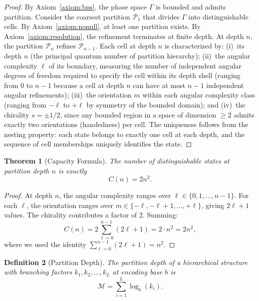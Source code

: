 \documentclass[twocolumn,10pt]{article}
\newtheorem{theorem}{Theorem}[section]
\newtheorem{definition}[theorem]{Definition}
\theoremstyle{remark}
\newcommand{\Depth}{\mathcal{M}}
\newcommand{\Partition}{\mathcal{P}}
\begin{document}
\begin{proof}
By Axiom~\ref{axiom:bps}, the phase space $\Gamma$ is bounded and admits partition. Consider the coarsest partition $\Partition_1$ that divides $\Gamma$ into distinguishable cells. By Axiom~\ref{axiom:nonull}, at least one partition exists. By Axiom~\ref{axiom:resolution}, the refinement terminates at finite depth. At depth $n$, the partition $\Partition_n$ refines $\Partition_{n-1}$. Each cell at depth $n$ is characterized by: (i)~its depth $n$ (the principal quantum number of partition hierarchy); (ii)~the angular complexity $\ell$ of its boundary, measuring the number of independent angular degrees of freedom required to specify the cell within its depth shell (ranging from $0$ to $n-1$ because a cell at depth $n$ can have at most $n-1$ independent angular refinements); (iii)~the orientation $m$ within each angular complexity class (ranging from $-\ell$ to $+\ell$ by symmetry of the bounded domain); and (iv)~the chirality $s = \pm 1/2$, since any bounded region in a space of dimension $\geq 2$ admits exactly two orientations (handedness) per cell. The uniqueness follows from the nesting property: each state belongs to exactly one cell at each depth, and the sequence of cell memberships uniquely identifies the state.
\end{proof}

\begin{theorem}[Capacity Formula]
\label{thm:capacity}
The number of distinguishable states at partition depth $n$ is exactly
\begin{equation}
C(n) = 2n^2.
\label{eq:capacity}
\end{equation}
\end{theorem}

\begin{proof}
At depth $n$, the angular complexity ranges over $\ell \in \{0, 1, \ldots, n-1\}$. For each $\ell$, the orientation ranges over $m \in \{-\ell, -\ell+1, \ldots, +\ell\}$, giving $2\ell + 1$ values. The chirality contributes a factor of $2$. Summing:
\begin{equation}
C(n) = 2 \sum_{\ell=0}^{n-1} (2\ell + 1) = 2 \cdot n^2 = 2n^2,
\end{equation}
where we used the identity $\sum_{\ell=0}^{n-1}(2\ell+1) = n^2$.
\end{proof}

\begin{definition}[Partition Depth]
\label{def:depth}
The partition depth of a hierarchical structure with branching factors $k_1, k_2, \ldots, k_L$ at encoding base $b$ is
\begin{equation}
\Depth = \sum_{i=1}^{L} \log_b(k_i).
\label{eq:depth}
\end{equation}
\end{definition}
\end{document}
